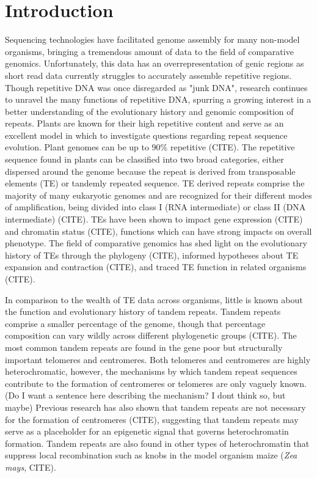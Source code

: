 \documentclass[10pt,letterpaper]{article}
\newcommand{\jri}[1]{\todo[size=\scriptsize, color=flame]{#1}}
\begin{document}
\linenumbers

\section*{Introduction}

Sequencing technologies have facilitated genome assembly for many non-model organisms, bringing a tremendous amount of data to the field of comparative genomics.
Unfortunately, this data has an overrepresentation of genic regions as short read data currently struggles to accurately assemble repetitive regions.
Though repetitive DNA was once disregarded as "junk DNA", research continues to unravel the many functions of repetitive DNA, spurring a growing interest in a better understanding of the evolutionary history and genomic composition of repeats.
Plants are known for their high repetitive content and serve as an excellent model in which to investigate questions regarding repeat sequence evolution.
Plant genomes can be up to 90\% repetitive (CITE).
The repetitive sequence found in plants can be classified into two broad categories, either dispersed around the genome because the repeat is derived from transposable elements (TE) or tandemly repeated sequence.
TE derived repeats comprise the majority of many eukaryotic genomes and are recognized for their different modes of amplification, being divided into class I (RNA intermediate) or class II (DNA intermediate) (CITE).
TEs have been shown to impact gene expression (CITE) and chromatin status (CITE), functions which can have strong impacts on overall phenotype.
The field of comparative genomics has shed light on the evolutionary history of TEs through the phylogeny (CITE), informed hypotheses about TE expansion and contraction (CITE), and traced TE function in related organisms (CITE).\jri{need to fill in citations before sending to Jiming!}

In comparison to the wealth of TE data across organisms, little is known about the function and evolutionary history of tandem repeats.
Tandem repeats comprise a smaller percentage of the genome, though that percentage composition can vary wildly across different phylogenetic groups (CITE).
The most common tandem repeats are found in the gene poor but structurally important telomeres and centromeres.
Both telomeres and centromeres are highly heterochromatic, however, the mechanisms by which tandem repeat sequences contribute to the formation of centromeres or telomeres are only vaguely known.
(Do I want a sentence here describing the mechanism?  I dont think so, but maybe)
Previous research has also shown that tandem repeats are not necessary for the formation of centromeres (CITE), suggesting that tandem repeats may serve as a placeholder for an epigenetic signal that governs heterochromatin formation.
Tandem repeats are also found in other types of heterochromatin that suppress local recombination such as knobs in the model organism maize (\emph{Zea mays}, CITE).
\end{document}
